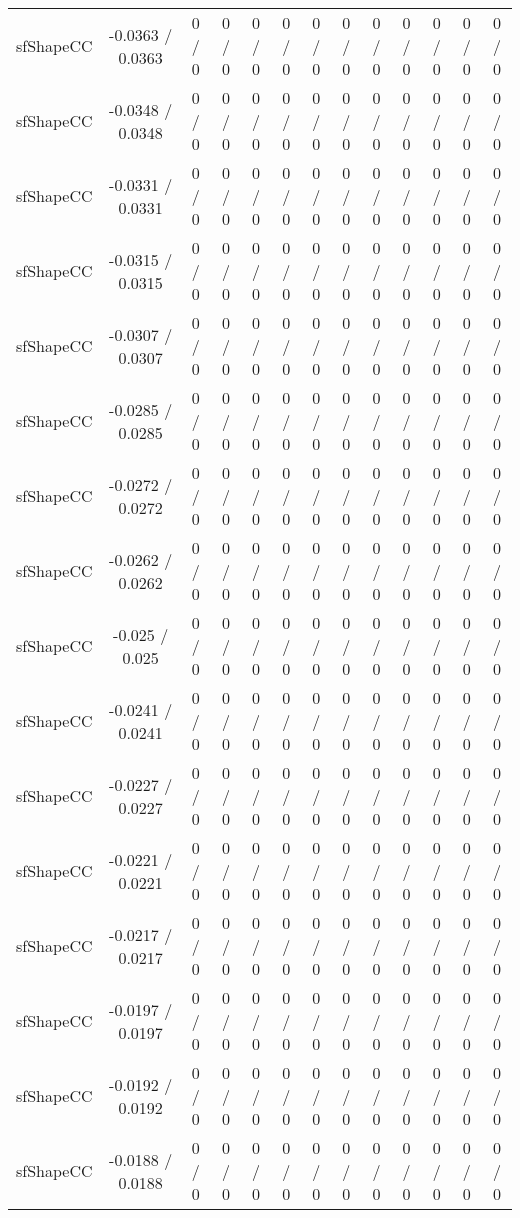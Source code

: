 \documentclass[10pt]{article}
\begin{document}
\begin{table}[htbp]
\begin{center}
\begin{tabular}{|c|c|c|c|c|c|c|c|c|c|c|c|c|}
  sfShapeCC & -0.0363 / 0.0363 & 0 / 0 & 0 / 0 & 0 / 0 & 0 / 0 & 0 / 0 & 0 / 0 & 0 / 0 & 0 / 0 & 0 / 0 & 0 / 0 & 0 / 0 \\ 
  sfShapeCC & -0.0348 / 0.0348 & 0 / 0 & 0 / 0 & 0 / 0 & 0 / 0 & 0 / 0 & 0 / 0 & 0 / 0 & 0 / 0 & 0 / 0 & 0 / 0 & 0 / 0 \\ 
  sfShapeCC & -0.0331 / 0.0331 & 0 / 0 & 0 / 0 & 0 / 0 & 0 / 0 & 0 / 0 & 0 / 0 & 0 / 0 & 0 / 0 & 0 / 0 & 0 / 0 & 0 / 0 \\ 
  sfShapeCC & -0.0315 / 0.0315 & 0 / 0 & 0 / 0 & 0 / 0 & 0 / 0 & 0 / 0 & 0 / 0 & 0 / 0 & 0 / 0 & 0 / 0 & 0 / 0 & 0 / 0 \\ 
  sfShapeCC & -0.0307 / 0.0307 & 0 / 0 & 0 / 0 & 0 / 0 & 0 / 0 & 0 / 0 & 0 / 0 & 0 / 0 & 0 / 0 & 0 / 0 & 0 / 0 & 0 / 0 \\ 
  sfShapeCC & -0.0285 / 0.0285 & 0 / 0 & 0 / 0 & 0 / 0 & 0 / 0 & 0 / 0 & 0 / 0 & 0 / 0 & 0 / 0 & 0 / 0 & 0 / 0 & 0 / 0 \\ 
  sfShapeCC & -0.0272 / 0.0272 & 0 / 0 & 0 / 0 & 0 / 0 & 0 / 0 & 0 / 0 & 0 / 0 & 0 / 0 & 0 / 0 & 0 / 0 & 0 / 0 & 0 / 0 \\ 
  sfShapeCC & -0.0262 / 0.0262 & 0 / 0 & 0 / 0 & 0 / 0 & 0 / 0 & 0 / 0 & 0 / 0 & 0 / 0 & 0 / 0 & 0 / 0 & 0 / 0 & 0 / 0 \\ 
  sfShapeCC & -0.025 / 0.025 & 0 / 0 & 0 / 0 & 0 / 0 & 0 / 0 & 0 / 0 & 0 / 0 & 0 / 0 & 0 / 0 & 0 / 0 & 0 / 0 & 0 / 0 \\ 
  sfShapeCC & -0.0241 / 0.0241 & 0 / 0 & 0 / 0 & 0 / 0 & 0 / 0 & 0 / 0 & 0 / 0 & 0 / 0 & 0 / 0 & 0 / 0 & 0 / 0 & 0 / 0 \\ 
  sfShapeCC & -0.0227 / 0.0227 & 0 / 0 & 0 / 0 & 0 / 0 & 0 / 0 & 0 / 0 & 0 / 0 & 0 / 0 & 0 / 0 & 0 / 0 & 0 / 0 & 0 / 0 \\ 
  sfShapeCC & -0.0221 / 0.0221 & 0 / 0 & 0 / 0 & 0 / 0 & 0 / 0 & 0 / 0 & 0 / 0 & 0 / 0 & 0 / 0 & 0 / 0 & 0 / 0 & 0 / 0 \\ 
  sfShapeCC & -0.0217 / 0.0217 & 0 / 0 & 0 / 0 & 0 / 0 & 0 / 0 & 0 / 0 & 0 / 0 & 0 / 0 & 0 / 0 & 0 / 0 & 0 / 0 & 0 / 0 \\ 
  sfShapeCC & -0.0197 / 0.0197 & 0 / 0 & 0 / 0 & 0 / 0 & 0 / 0 & 0 / 0 & 0 / 0 & 0 / 0 & 0 / 0 & 0 / 0 & 0 / 0 & 0 / 0 \\ 
  sfShapeCC & -0.0192 / 0.0192 & 0 / 0 & 0 / 0 & 0 / 0 & 0 / 0 & 0 / 0 & 0 / 0 & 0 / 0 & 0 / 0 & 0 / 0 & 0 / 0 & 0 / 0 \\ 
  sfShapeCC & -0.0188 / 0.0188 & 0 / 0 & 0 / 0 & 0 / 0 & 0 / 0 & 0 / 0 & 0 / 0 & 0 / 0 & 0 / 0 & 0 / 0 & 0 / 0 & 0 / 0 \\ 

\end{tabular}
\end{center}
\end{table}
\end{document}
